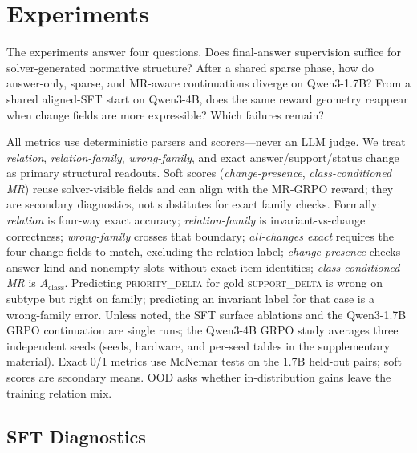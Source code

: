\documentclass[letterpaper]{article}
\newcommand{\method}{MR-GRPO}
\newcommand{\lab}[1]{\textsc{#1}}
\begin{document}
\section{Experiments}

The experiments answer four questions. Does final-answer supervision suffice for solver-generated normative structure? After a shared sparse phase, how do answer-only, sparse, and MR-aware continuations diverge on Qwen3-1.7B? From a shared aligned-SFT start on Qwen3-4B, does the same reward geometry reappear when change fields are more expressible? Which failures remain?

All metrics use deterministic parsers and scorers---never an LLM judge. We treat \emph{relation}, \emph{relation-family}, \emph{wrong-family}, and exact answer/support/status change as primary structural readouts. Soft scores (\emph{change-presence}, \emph{class-conditioned MR}) reuse solver-visible fields and can align with the \method{} reward; they are secondary diagnostics, not substitutes for exact family checks. Formally: \emph{relation} is four-way exact accuracy; \emph{relation-family} is invariant-vs-change correctness; \emph{wrong-family} crosses that boundary; \emph{all-changes exact} requires the four change fields to match, excluding the relation label; \emph{change-presence} checks answer kind and nonempty slots without exact item identities; \emph{class-conditioned MR} is $A_{\mathrm{class}}$. Predicting \lab{priority\_delta} for gold \lab{support\_delta} is wrong on subtype but right on family; predicting an invariant label for that case is a wrong-family error. Unless noted, the SFT surface ablations and the Qwen3-1.7B GRPO continuation are single runs; the Qwen3-4B GRPO study averages three independent seeds (seeds, hardware, and per-seed tables in the supplementary material). Exact 0/1 metrics use McNemar tests on the 1.7B held-out pairs; soft scores are secondary means. OOD asks whether in-distribution gains leave the training relation mix.

\subsection{SFT Diagnostics}
\end{document}
